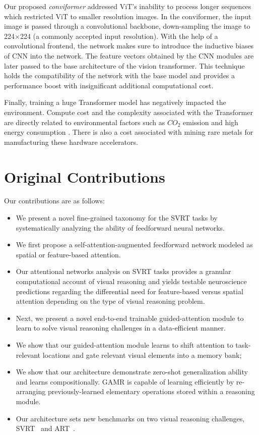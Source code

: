 Our proposed \textit{conviformer}  \cite{vaishnav2022conviformers} addressed ViT's inability to process longer sequences which restricted ViT to smaller resolution images. In the conviformer, the input image is passed through a convolutional backbone, down-sampling the image to 224$\times$224 (a commonly accepted input resolution). With the help of a convolutional frontend, the network makes sure to introduce the inductive biases of CNN into the network. The feature vectors obtained by the CNN modules are later passed to the base architecture of the vision transformer. This technique holds the compatibility of the network with the base model and provides a performance boost with insignificant additional computational cost.

Finally, training a huge Transformer model has negatively impacted the environment. Compute cost and the complexity associated with the Transformer are directly related to environmental factors such as $CO_2$ emission \citep{Strubell2020} and high energy consumption \citep{You2020Drawing}. There is also a cost associated with mining rare metals for manufacturing these hardware accelerators. 

\section{Original Contributions}
Our contributions are as follows:
\begin{itemize}
    \item We present a novel fine-grained taxonomy for the SVRT tasks by systematically analyzing the ability of feedforward neural networks.
    \item We first propose a self-attention-augmented feedforward network modeled as spatial or feature-based attention. 
    \item Our attentional networks analysis on SVRT tasks provides a granular computational account of visual reasoning and yields testable neuroscience predictions regarding the differential need for feature-based versus spatial attention depending on the type of visual reasoning problem.
    \item Next, we present a novel end-to-end trainable guided-attention module to learn to solve visual reasoning challenges in a data-efficient manner.
    \item We show that our guided-attention module learns to shift attention to task-relevant locations and gate relevant visual elements into a memory bank; 
    \item We show that our architecture demonstrate zero-shot generalization ability and learns compositionally. GAMR is capable of learning efficiently by re-arranging previously-learned elementary operations stored within a reasoning module. 
    \item Our architecture sets new benchmarks on two visual reasoning challenges, SVRT~\citep{fleuret2011comparing} and ART~\citep{Webb2021EmergentST}. 
\end{itemize}


